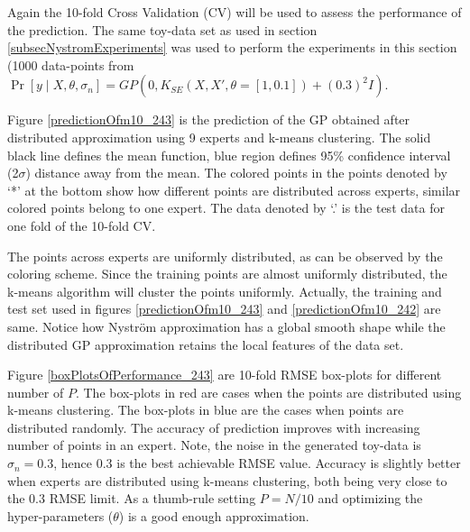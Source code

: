 Again the 10-fold Cross Validation (CV) will be used to assess the performance of the prediction. The same toy-data set as used in section \ref{subsecNystromExperiments} was used to perform the experiments in this section (1000 data-points from $\Pr[y \mid X, \theta, \sigma_{n}] = GP(0, K_{SE}(X, X', \theta = [1, 0.1]) + (0.3)^{2}I)$.

Figure \ref{predictionOfm10_243} is the prediction of the GP obtained after distributed approximation using 9 experts and k-means clustering. The solid black line defines the mean function, blue region defines 95\% confidence interval (2$\sigma$) distance away from the mean. The colored points in the points denoted by `*' at the bottom show how different points are distributed across experts, similar colored points belong to one expert. The data denoted by `.' is the test data for one fold of the 10-fold CV. 

The points across experts are uniformly distributed, as can be observed by the coloring scheme. Since the training points are almost uniformly distributed, the k-means algorithm will cluster the points uniformly. Actually, the training and test set used in figures \ref{predictionOfm10_243} and \ref{predictionOfm10_242} are same. Notice how Nystr\"{o}m approximation has a global smooth shape while the distributed GP approximation retains the local features of the data set. 

Figure \ref{boxPlotsOfPerformance_243} are 10-fold RMSE box-plots for different number of $P$. The box-plots in red are cases when the points are distributed using k-means clustering. The box-plots in blue are the cases when points are distributed randomly. The accuracy of prediction improves with increasing number of points in an expert. Note, the noise in the generated toy-data is $\sigma_{n}=0.3$, hence $0.3$ is the best achievable RMSE value. Accuracy is slightly better when experts are distributed using k-means clustering, both being very close to the $0.3$ RMSE limit. As a thumb-rule setting $P = N/10$ and optimizing the hyper-parameters ($\theta$) is a good enough approximation. 


